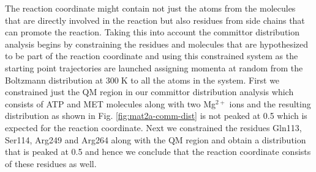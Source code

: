 \documentclass[journal=jpcbfk,manuscript=article,layout=traditional]{achemso}
\begin{document}
The reaction coordinate might contain not just the atoms from the molecules that 
are directly involved in the reaction but also residues from side chains that can 
promote the reaction. \cite{Schramm18Biochem57p3299} Taking this into account the 
committor distribution analysis
begins by constraining the residues and molecules that are hypothesized to be part of the 
reaction coordinate and using this constrained system as the starting point 
trajectories are launched assigning momenta at random from the Boltzmann distribution at 
$300\;\text{K}$ to all the atoms in the system. 
First we constrained just the QM region in our committor distribution analysis 
which consists of ATP and MET molecules along with two Mg$^{2+}$ ions and the 
resulting distribution as shown in Fig. \ref{fig:mat2a-comm-dist} is not peaked 
at 0.5 which is expected for the reaction coordinate. 
Next we constrained the residues Gln113, Ser114, Arg249 and Arg264 along with the 
QM region and obtain a distribution that is peaked at 0.5 and hence we 
conclude that the reaction coordinate consists of these residues as well. 
\end{document}

